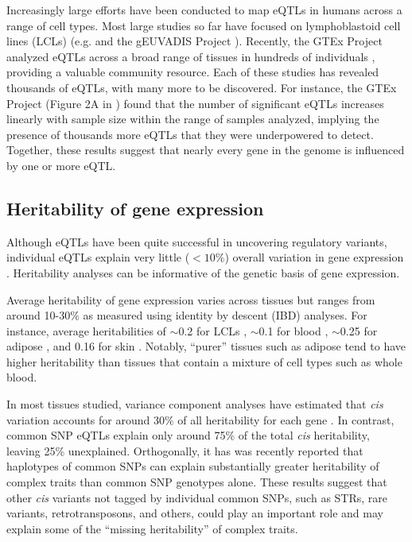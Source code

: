 Increasingly large efforts have been conducted to map eQTLs in humans across a range of cell types. Most large studies so far have focused on lymphoblastoid cell lines (LCLs) (e.g. \cite{GaffneyVeyrierasDegnerEtAl2012} and the gEUVADIS Project \cite{LappalainenSammethFriedlanderEtAl2013}). Recently, the GTEx Project analyzed eQTLs across a broad range of tissues in hundreds of individuals \cite{ArdlieDelucaSegreEtAl2015}, providing a valuable community resource. Each of these studies has revealed thousands of eQTLs, with many more to be discovered. For instance, the GTEx Project (Figure 2A in \cite{ArdlieDelucaSegreEtAl2015}) found that the number of significant eQTLs increases linearly with sample size within the range of samples analyzed, implying the presence of thousands more eQTLs that they were underpowered to detect. Together, these results suggest that nearly every gene in the genome is influenced by one or more eQTL.

\subsection{Heritability of gene expression}
Although eQTLs have been quite successful in uncovering regulatory variants, individual eQTLs explain very little ($< 10\%$) overall variation in gene expression \cite{GrundbergSmallHedmanEtAl2012}. Heritability analyses can be informative of the genetic basis of gene expression.

Average heritability of gene expression varies across tissues but ranges from around 10-30\% as measured using identity by descent (IBD) analyses. For instance, average heritabilities of $\sim$0.2 for LCLs \cite{GrundbergSmallHedmanEtAl2012,DixonLiangMoffattEtAl2007}, $\sim$0.1 for blood \cite{PriceHelgasonThorleifssonEtAl2011,WrightSullivanBrooksEtAl2014}, $\sim$0.25 for adipose \cite{PriceHelgasonThorleifssonEtAl2011,GrundbergSmallHedmanEtAl2012}, and 0.16 for skin \cite{GrundbergSmallHedmanEtAl2012}. Notably, ``purer'' tissues such as adipose tend to have higher heritability than tissues that contain a mixture of cell types such as whole blood.

In most tissues studied, variance component analyses have estimated that \emph{cis} variation accounts for around 30\% of all heritability for each gene \cite{GrundbergSmallHedmanEtAl2012,PriceHelgasonThorleifssonEtAl2011}. In contrast, common SNP eQTLs explain only around 75\% of the total \emph{cis} heritability, leaving 25\% unexplained.  Orthogonally, it has was recently reported that haplotypes of common SNPs can explain substantially greater heritability of complex traits than common SNP genotypes alone. These results suggest that other \emph{cis} variants not tagged by individual common SNPs, such as STRs, rare variants, retrotransposons, and others, could play an important role and may explain some of the ``missing heritability'' of complex traits.

